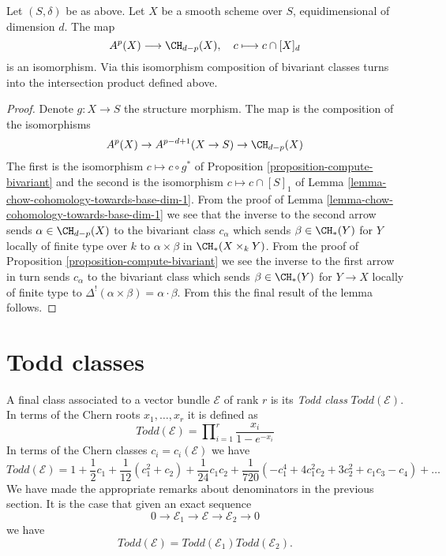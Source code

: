\begin{lemma}
\label{lemma-identify-chow-for-smooth-dim-1}
Let $(S, \delta)$ be as above. Let $X$ be a smooth scheme over $S$,
equidimensional of dimension $d$. The map
$$
A^p(X) \longrightarrow \CH_{d - p}(X),\quad
c \longmapsto c \cap [X]_d
$$
is an isomorphism. Via this isomorphism composition of bivariant
classes turns into the intersection product defined above.
\end{lemma}

\begin{proof}
Denote $g : X \to S$ the structure morphism.
The map is the composition of the isomorphisms
$$
A^p(X) \to A^{p - d + 1}(X \to S) \to \CH_{d - p}(X)
$$
The first is the isomorphism $c \mapsto c \circ g^*$ of
Proposition \ref{proposition-compute-bivariant}
and the second is the isomorphism $c \mapsto c \cap [S]_1$ of
Lemma \ref{lemma-chow-cohomology-towards-base-dim-1}.
From the proof of Lemma \ref{lemma-chow-cohomology-towards-base-dim-1}
we see that the inverse to the second arrow sends $\alpha \in \CH_{d - p}(X)$
to the bivariant class $c_\alpha$ which sends $\beta \in \CH_*(Y)$
for $Y$ locally of finite type over $k$
to $\alpha \times \beta$ in $\CH_*(X \times_k Y)$. From the proof of
Proposition \ref{proposition-compute-bivariant} we see the inverse
to the first arrow in turn sends $c_\alpha$ to the bivariant class
which sends $\beta \in \CH_*(Y)$ for $Y \to X$ locally of finite type
to $\Delta^!(\alpha \times \beta) = \alpha \cdot \beta$.
From this the final result of the lemma follows.
\end{proof}










\section{Todd classes}
\label{section-todd-classes}

\noindent
A final class associated to a vector bundle $\mathcal{E}$
of rank $r$ is its {\it Todd class} $Todd(\mathcal{E})$.
In terms of the Chern roots $x_1, \ldots, x_r$ it is
defined as
$$
Todd(\mathcal{E})
=
\prod\nolimits_{i = 1}^r
\frac{x_i}{1 - e^{-x_i}}
$$
In terms of the Chern classes $c_i = c_i(\mathcal{E})$
we have
$$
Todd(\mathcal{E})
=
1
+
\frac{1}{2}c_1
+
\frac{1}{12}(c_1^2 + c_2)
+
\frac{1}{24}c_1c_2
+
\frac{1}{720}(-c_1^4 + 4c_1^2c_2 + 3c_2^2 + c_1c_3 - c_4)
+
\ldots
$$
We have made the appropriate remarks about denominators
in the previous section. It is the case that
given an exact sequence
$$
0
\to
{\mathcal E}_1
\to
{\mathcal E}
\to
{\mathcal E}_2
\to
0
$$
we have
$$
Todd({\mathcal E}) = Todd({\mathcal E}_1) Todd({\mathcal E}_2).
$$







